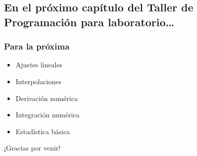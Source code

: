\documentclass{beamer}
\begin{document}
\subsection{En el próximo capítulo del Taller de Programación para laboratorio\ldots}
\begin{frame}
    \frametitle{Para la próxima}
   \begin{itemize}
   \item Ajustes lineales
   \item Interpolaciones
   \item Derivación numérica
   \item Integración numérica
   \item Estadística básica
   \end{itemize}
\end{frame}






\begin{frame}
  
  \begin{center}\begin{Huge} ¡Gracias por venir! \end{Huge}\end{center}
\end{frame}



\end{document}
